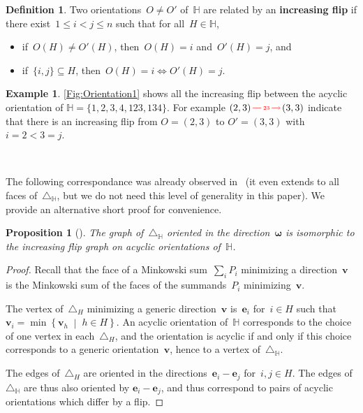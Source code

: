 \documentclass[reqno]{amsart}
\newtheorem{proposition}[theorem]{Proposition}
\theoremstyle{definition}
\newtheorem{definition}[theorem]{Definition}
\newtheorem{example}[theorem]{Example}
\renewcommand{\b}[1]{\boldsymbol{#1}} %
\newcommand{\set}[2]{\left\{ #1 \;\middle|\; #2 \right\}} %
\newcommand{\simplex}{\triangle} %
\newcommand{\defn}[1]{\textbf{\textsf{\color{PineGreen} #1}}} %
\newcommand{\nantel}[1]{\todo[size=\tiny,color=red!30]{ #1 \\ \hfill --- N.}\,}
\newcommand{\HH}{\mathbb H}  %
\begin{document}
\begin{definition}
\label{def:flip}
Two orientations~$O \ne O'$ of~$\HH$ are related by an \defn{increasing flip} if there exist~${1 \le i < j \le n}$ such that for all~$H \in \HH$, 
\begin{itemize}
\item if~$O(H) \ne O'(H)$, then~$O(H) = i$ and~$O'(H) = j$, and
\item if~$\{i,j\} \subseteq H$, then~$O(H) = i \iff O'(H) = j$.
\end{itemize}
\end{definition}



\begin{example} \cref{Fig:Orientation1} shows all the increasing flip between the acyclic orientation of $\HH=\{ 1, 2, 3, 4, 123, 134 \}$. For example 
$(2,3)\, \begin{tikzpicture}[scale=1,baseline=-.1cm] \path[color=red, ->]  (0,0) edge node[fill=white,inner sep=2pt, font=\tiny ] {$  23$} (1,0); \end{tikzpicture}\, (3,3)$
indicate that there is an increasing flip from  $O=(2,3)$ to $O'=(3,3)$ with $i=2<3=j$.

\nantel{done}
\end{example}

The following correspondance was already observed in~\cite[Thm.~2.18]{BenedettiBergeronMachacek} (it even extends to all faces of~$\simplex_\HH$, but we do not need this level of generality in this paper).
We provide an alternative short proof for convenience.

\begin{proposition}[{\cite[Thm.~2.18]{BenedettiBergeronMachacek}}]
\label{prop:Hgraph}
The graph of~$\simplex_\HH$ oriented in the direction~$\b{\omega}$ is isomorphic to the increasing flip graph on acyclic orientations of~$\HH$.
\end{proposition}

\begin{proof}
Recall that the face of a Minkowski sum~$\sum_i P_i$ minimizing a direction~$\b{v}$ is the Minkowski sum of the faces of the summands~$P_i$ minimizing~$\b{v}$.

The vertex of~$\simplex_H$ minimizing a generic direction~$\b{v}$ is~$\b{e}_i$ for~$i \in H$ such that~$\b{v}_i = \min\set{\b{v}_h}{h \in H}$.
An acyclic orientation of~$\HH$ corresponds to the choice of one vertex in each~$\simplex_H$, and the orientation is acyclic if and only if this choice corresponds to a generic orientation~$\b{v}$, hence to a vertex of~$\simplex_\HH$.

The edges of~$\simplex_H$ are oriented in the directions~$\b{e}_i-\b{e}_j$ for~$i,j \in H$.
The edges of~$\simplex_\HH$ are thus also oriented by $\b{e}_i-\b{e}_j$, and thus correspond to pairs of acyclic orientations which differ by a flip.
\end{proof}
\end{document}
